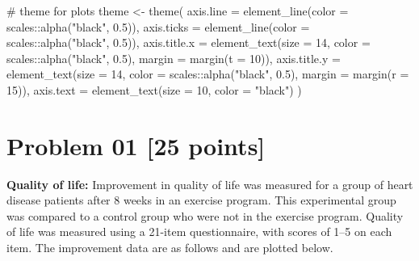 \documentclass[
  letterpaper,
  DIV=11,
  numbers=noendperiod]{scrartcl}
\newenvironment{Shaded}{\begin{snugshade}}{\end{snugshade}}
\newcommand{\AttributeTok}[1]{\textcolor[rgb]{0.40,0.45,0.13}{#1}}
\newcommand{\CommentTok}[1]{\textcolor[rgb]{0.37,0.37,0.37}{#1}}
\newcommand{\DecValTok}[1]{\textcolor[rgb]{0.68,0.00,0.00}{#1}}
\newcommand{\FloatTok}[1]{\textcolor[rgb]{0.68,0.00,0.00}{#1}}
\newcommand{\FunctionTok}[1]{\textcolor[rgb]{0.28,0.35,0.67}{#1}}
\newcommand{\NormalTok}[1]{\textcolor[rgb]{0.00,0.23,0.31}{#1}}
\newcommand{\OtherTok}[1]{\textcolor[rgb]{0.00,0.23,0.31}{#1}}
\newcommand{\SpecialCharTok}[1]{\textcolor[rgb]{0.37,0.37,0.37}{#1}}
\newcommand{\StringTok}[1]{\textcolor[rgb]{0.13,0.47,0.30}{#1}}
\begin{document}
\begin{Shaded}
\begin{Highlighting}[]
\CommentTok{\# theme for plots}
\NormalTok{theme }\OtherTok{\textless{}{-}} \FunctionTok{theme}\NormalTok{(}
    \AttributeTok{axis.line =} \FunctionTok{element\_line}\NormalTok{(}\AttributeTok{color =}\NormalTok{ scales}\SpecialCharTok{::}\FunctionTok{alpha}\NormalTok{(}\StringTok{"black"}\NormalTok{, }\FloatTok{0.5}\NormalTok{)),}
    \AttributeTok{axis.ticks =} \FunctionTok{element\_line}\NormalTok{(}\AttributeTok{color =}\NormalTok{ scales}\SpecialCharTok{::}\FunctionTok{alpha}\NormalTok{(}\StringTok{"black"}\NormalTok{, }\FloatTok{0.5}\NormalTok{)),}
    \AttributeTok{axis.title.x =} \FunctionTok{element\_text}\NormalTok{(}\AttributeTok{size =} \DecValTok{14}\NormalTok{, }
                                \AttributeTok{color =}\NormalTok{ scales}\SpecialCharTok{::}\FunctionTok{alpha}\NormalTok{(}\StringTok{"black"}\NormalTok{, }\FloatTok{0.5}\NormalTok{),}
                                \AttributeTok{margin =} \FunctionTok{margin}\NormalTok{(}\AttributeTok{t =} \DecValTok{10}\NormalTok{)),}
    \AttributeTok{axis.title.y =} \FunctionTok{element\_text}\NormalTok{(}\AttributeTok{size =} \DecValTok{14}\NormalTok{, }
                                \AttributeTok{color =}\NormalTok{ scales}\SpecialCharTok{::}\FunctionTok{alpha}\NormalTok{(}\StringTok{"black"}\NormalTok{, }\FloatTok{0.5}\NormalTok{),}
                                \AttributeTok{margin =} \FunctionTok{margin}\NormalTok{(}\AttributeTok{r =} \DecValTok{15}\NormalTok{)),}
    \AttributeTok{axis.text =} \FunctionTok{element\_text}\NormalTok{(}\AttributeTok{size =} \DecValTok{10}\NormalTok{, }\AttributeTok{color =} \StringTok{"black"}\NormalTok{) }
\NormalTok{  )}
\end{Highlighting}
\end{Shaded}

\section{Problem 01 {[}25 points{]}}\label{problem-01-25-points}

\textbf{Quality of life:} Improvement in quality of life was measured
for a group of heart disease patients after 8 weeks in an exercise
program. This experimental group was compared to a control group who
were not in the exercise program. Quality of life was measured using a
21-item questionnaire, with scores of 1--5 on each item. The improvement
data are as follows and are plotted below.
\end{document}
